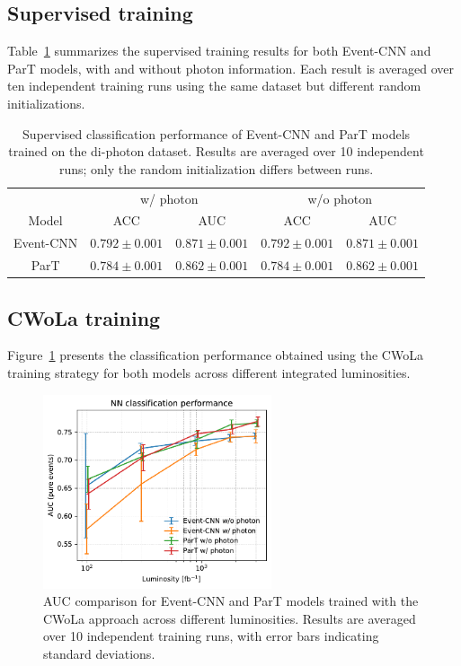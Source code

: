 \documentclass[12pt]{article}
\begin{document}
	\subsection{Supervised training}%
	\label{sub:supervised_training}
		Table~\ref{tab:supervised_CNN_ParT_diphoton_w_wo_photon} summarizes the supervised training results for both Event-CNN and ParT models, with and without photon information. Each result is averaged over ten independent training runs using the same dataset but different random initializations. 
        \begin{table}[htpb]
            \centering
            \caption{Supervised classification performance of Event-CNN and ParT models trained on the di-photon dataset. Results are averaged over 10 independent runs; only the random initialization differs between runs.}
            \label{tab:supervised_CNN_ParT_diphoton_w_wo_photon}
            \begin{tabular}{c|cc|cc}
						  & \multicolumn{2}{c|}{w/ photon}         & \multicolumn{2}{c}{w/o photon}        \\ 
				Model     & ACC               & AUC               & ACC               & AUC               \\ \hline
				Event-CNN & $0.792 \pm 0.001$ & $0.871 \pm 0.001$ & $0.792 \pm 0.001$ & $0.871 \pm 0.001$ \\
				ParT      & $0.784 \pm 0.001$ & $0.862 \pm 0.001$ & $0.784 \pm 0.001$ & $0.862 \pm 0.001$
			\end{tabular}        
		\end{table}	
	
	\subsection{CWoLa training}%
	\label{sub:cwola_training}
		Figure~\ref{fig:CWoLa_CNN_ParT_diphoton_w_wo_photon_L} presents the classification performance obtained using the CWoLa training strategy for both models across different integrated luminosities.
		\begin{figure}[htpb]
			\centering
			\includegraphics[width=0.60\textwidth]{NN_AUC-true_L.pdf}
			\caption{AUC comparison for Event-CNN and ParT models trained with the CWoLa approach across different luminosities. Results are averaged over 10 independent training runs, with error bars indicating standard deviations.}
			\label{fig:CWoLa_CNN_ParT_diphoton_w_wo_photon_L}
		\end{figure}
        
\end{document}
